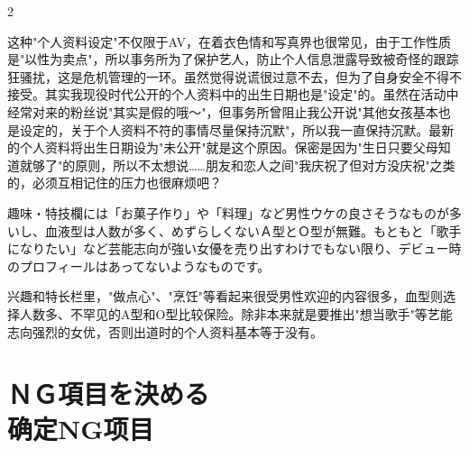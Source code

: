 \documentclass[12pt,UTF8]{ctexbook}
\begin{document}
\begin{paracol}{2}
\switchcolumn

这种"个人资料设定"不仅限于AV，在着衣色情和写真界也很常见，由于工作性质是"以性为卖点"，所以事务所为了保护艺人，防止个人信息泄露导致被奇怪的跟踪狂骚扰，这是危机管理的一环。虽然觉得说谎很过意不去，但为了自身安全不得不接受。其实我现役时代公开的个人资料中的出生日期也是"设定"的。虽然在活动中经常对来的粉丝说"其实是假的哦〜"，但事务所曾阻止我公开说"其他女孩基本也是设定的，关于个人资料不符的事情尽量保持沉默"，所以我一直保持沉默。最新的个人资料将出生日期设为"未公开"就是这个原因。保密是因为"生日只要父母知道就够了"的原则，所以不太想说……朋友和恋人之间"我庆祝了但对方没庆祝"之类的，必须互相记住的压力也很麻烦吧？

\switchcolumn*

趣味・特技欄には「お菓子作り」や「料理」など男性ウケの良さそうなものが多いし、血液型は人数が多く、めずらしくないＡ型とＯ型が無難。もともと「歌手になりたい」など芸能志向が強い女優を売り出すわけでもない限り、デビュー時のプロフィールはあってないようなものです。

\switchcolumn

兴趣和特长栏里，"做点心"、"烹饪"等看起来很受男性欢迎的内容很多，血型则选择人数多、不罕见的A型和O型比较保险。除非本来就是要推出"想当歌手"等艺能志向强烈的女优，否则出道时的个人资料基本等于没有。

\end{paracol}

\section{ＮＧ項目を決める\\确定NG项目}
\end{document}
